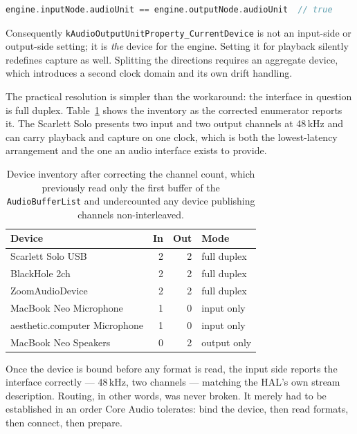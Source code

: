\documentclass[10pt,letterpaper,twocolumn]{article}
\newcommand{\code}[1]{\texttt{#1}}
\begin{document}
\begin{lstlisting}[language=Swift]
engine.inputNode.audioUnit == engine.outputNode.audioUnit  // true
\end{lstlisting}

Consequently \code{kAudioOutputUnit\allowbreak Property\allowbreak\_CurrentDevice} is not an input-side or output-side setting; it is \emph{the} device for the engine. Setting it for playback silently redefines capture as well. Splitting the directions requires an aggregate device, which introduces a second clock domain and its own drift handling.

The practical resolution is simpler than the workaround: the interface in question is full duplex. Table~\ref{tab:devices} shows the inventory as the corrected enumerator reports it. The Scarlett Solo presents two input and two output channels at 48\,kHz and can carry playback and capture on one clock, which is both the lowest-latency arrangement and the one an audio interface exists to provide.

\begin{table}[t]
\centering
\small
\begin{tabular}{@{}lrrl@{}}
\toprule
\textbf{Device} & \textbf{In} & \textbf{Out} & \textbf{Mode} \\
\midrule
Scarlett Solo USB & 2 & 2 & full duplex \\
BlackHole 2ch & 2 & 2 & full duplex \\
ZoomAudioDevice & 2 & 2 & full duplex \\
MacBook Neo Microphone & 1 & 0 & input only \\
aesthetic.computer Microphone & 1 & 0 & input only \\
MacBook Neo Speakers & 0 & 2 & output only \\
\bottomrule
\end{tabular}
\caption{Device inventory after correcting the channel count, which previously read only the first buffer of the \code{AudioBufferList} and undercounted any device publishing channels non-interleaved.}
\label{tab:devices}
\end{table}

Once the device is bound before any format is read, the input side reports the interface correctly --- 48\,kHz, two channels --- matching the HAL's own stream description. Routing, in other words, was never broken. It merely had to be established in an order Core Audio tolerates: bind the device, then read formats, then connect, then prepare.
\end{document}
